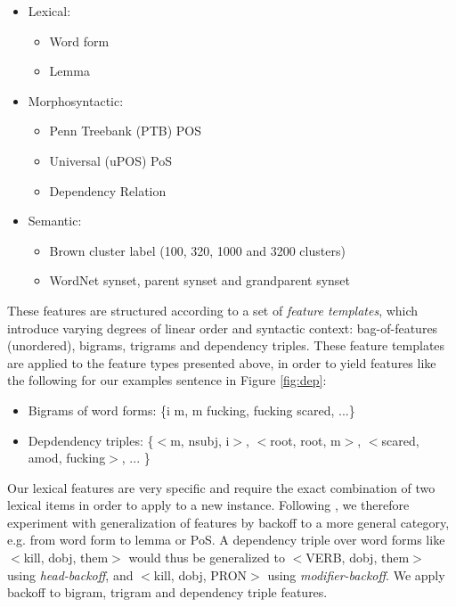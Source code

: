 \documentclass[11pt,letterpaper]{article}
\begin{document}
\begin{itemize}[noitemsep]
\item Lexical:
  \begin{itemize}[noitemsep]
  \item Word form
  \item Lemma
  \end{itemize}
  
\item Morphosyntactic:
  \begin{itemize}[noitemsep]
  \item Penn Treebank (PTB) POS
  \item Universal (uPOS) PoS
  \item Dependency Relation
  \end{itemize}
  
\item Semantic:
  \begin{itemize}[noitemsep]
    \item Brown cluster label (100, 320, 1000 and 3200 clusters)
    \item WordNet synset, parent synset and grandparent synset
  \end{itemize}
\end{itemize}


These features are structured according to a set of \emph{feature templates}, which introduce varying degrees of linear order and syntactic context: bag-of-features (unordered), bigrams, trigrams and dependency triples. These feature templates are applied to the feature types presented above, in order to yield features like the following for our examples sentence in Figure \ref{fig:dep}:

\begin{itemize}
\setlength\itemsep{0em}
\item Bigrams of word forms: \{i m,  m fucking, fucking scared, ...\}

\item Depdendency triples: \{$<$m, nsubj, i$>$, $<$root, root, m$>$, $<$scared, amod, fucking$>$, ... \}
\end{itemize}
Our lexical features are very specific and require the exact combination of two lexical items in order to apply to a new instance. Following , we therefore experiment with generalization of features by backoff to a more general category, e.g. from word form to lemma or PoS. A dependency triple over word forms like $<$kill, dobj, them$>$ would thus be generalized to $<$VERB, dobj, them$>$ using \emph{head-backoff}, and $<$kill, dobj, PRON$>$ using \emph{modifier-backoff}. We apply backoff to bigram, trigram and dependency triple features. 
\end{document}
